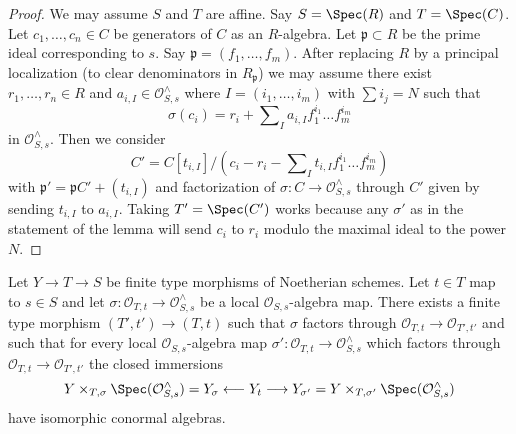 \begin{proof}
We may assume $S$ and $T$ are affine. Say $S = \Spec(R)$ and
$T = \Spec(C)$. Let $c_1, \ldots, c_n \in C$ be generators
of $C$ as an $R$-algebra. Let $\mathfrak p \subset R$ be the
prime ideal corresponding to $s$. Say $\mathfrak p = (f_1, \ldots, f_m)$.
After replacing $R$ by a principal localization
(to clear denominators in $R_\mathfrak p$)
we may assume there exist
$r_1, \ldots, r_n \in R$ and $a_{i, I} \in \mathcal{O}_{S, s}^\wedge$
where $I = (i_1, \ldots, i_m)$ with $\sum i_j = N$ such that
$$
\sigma(c_i) = r_i + \sum\nolimits_I a_{i, I} f_1^{i_1} \ldots f_m^{i_m}
$$
in $\mathcal{O}_{S, s}^\wedge$. Then we consider
$$
C' = C[t_{i, I}]/
\left(c_i - r_i - \sum\nolimits_I t_{i, I} f_1^{i_1} \ldots f_m^{i_m}\right)
$$
with $\mathfrak p' = \mathfrak pC' + (t_{i, I})$ and factorization
of $\sigma : C \to \mathcal{O}_{S, s}^\wedge$ through $C'$
given by sending $t_{i, I}$ to $a_{i, I}$.
Taking $T' = \Spec(C')$ works because any $\sigma'$ as in the statement
of the lemma will send $c_i$ to $r_i$ modulo the maximal ideal
to the power $N$.
\end{proof}

\begin{lemma}
\label{lemma-control-graded}
Let $Y \to T \to S$ be finite type morphisms of Noetherian schemes.
Let $t \in T$ map to $s \in S$ and let
$\sigma : \mathcal{O}_{T, t} \to \mathcal{O}_{S, s}^\wedge$
be a local $\mathcal{O}_{S, s}$-algebra map.
There exists a finite type morphism $(T', t') \to (T, t)$
such that $\sigma$ factors through
$\mathcal{O}_{T, t} \to \mathcal{O}_{T', t'}$
and such that for every local $\mathcal{O}_{S, s}$-algebra map
$\sigma' : \mathcal{O}_{T, t} \to \mathcal{O}_{S, s}^\wedge$
which factors through $\mathcal{O}_{T, t} \to \mathcal{O}_{T', t'}$
the closed immersions
$$
Y \times_{T, \sigma} \Spec(\mathcal{O}_{S, s}^\wedge) = Y_\sigma
\longleftarrow Y_t \longrightarrow
Y_{\sigma'} =
Y \times_{T, \sigma'} \Spec(\mathcal{O}_{S, s}^\wedge)
$$
have isomorphic conormal algebras.
\end{lemma}

